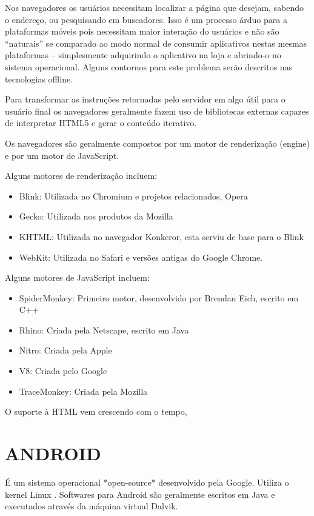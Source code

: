 \documentclass[
12pt,
a4paper,
portuges,
draft
]{report}
\begin{document}
Nos navegadores os usuários necessitam localizar a página que desejam,
sabendo o endereço, ou pesquisando em buscadores. Isso é um processo
árduo para a plataformas móveis pois necessitam maior interação
do usuários e não são “naturais” se comparado ao modo normal
de consumir aplicativos nestas mesmas plataformas – simplesmente
adquirindo o aplicativo na loja e abrindo-o no sistema operacional.
Alguns contornos para este problema serão descritos nas tecnologias
offline.

Para transformar as instruções retornadas pelo servidor em algo útil
para o usuário final os navegadores geralmente fazem uso de bibliotecas
externas capazes de interpretar HTML5 e gerar o conteúdo iterativo.

Os navegadores são geralmente compostos por um motor de renderização (engine)
e por um motor de JavaScript.

Alguns motores de renderização incluem:

\begin{itemize}
    \item Blink: Utilizada no Chromium e projetos relacionados, Opera
    \item Gecko: Utilizada nos produtos da Mozilla
    \item KHTML: Utilizada no navegador Konkeror, esta serviu de base para o Blink
    \item WebKit: Utilizada no Safari e versões antigas do Google Chrome.
\end{itemize}

Alguns motores de JavaScript incluem:

\begin{itemize}
    \item SpiderMonkey: Primeiro motor, desenvolvido por Brendan Eich, escrito em C++
    \item Rhino: Criada pela Netscape, escrito em Java
    \item Nitro: Criada pela Apple
    \item V8: Criada pelo Google
    \item TraceMonkey: Criada pela Mozilla
\end{itemize}

O suporte à HTML vem crescendo com o tempo, 


\section{ANDROID}

É um sistema operacional *open-source* desenvolvido pela Google.
Utiliza o kernel Linux .
Softwares para Android são geralmente escritos em Java e executados
através da máquina virtual Dalvik.
\end{document}
